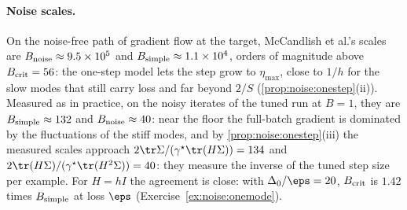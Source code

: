 \begin{refsection}
\paragraph{Noise scales.} On the noise-free path of gradient flow at the target, McCandlish et al.'s scales are $B_{\mathrm{noise}}\approx9.5\times10^5$ and $B_{\mathrm{simple}}\approx1.1\times10^4$, orders of magnitude above $B_{\mathrm{crit}}=56$: the one-step model lets the step grow to $\eta_{\max}$, close to $1/h$ for the slow modes that still carry loss and far beyond $2/S$ (\cref{prop:noise:onestep}(ii)). Measured as in practice, on the noisy iterates of the tuned run at $B=1$, they are $B_{\mathrm{simple}}\approx132$ and $B_{\mathrm{noise}}\approx40$: near the floor the full-batch gradient is dominated by the fluctuations of the stiff modes, and by \cref{prop:noise:onestep}(iii) the measured scales approach $2\tr\Sigma/(\gamma^\star\tr(H\Sigma))=134$ and $2\tr(H\Sigma)/(\gamma^\star\tr(H^2\Sigma))=40$: they measure the inverse of the tuned step size per example. For $H=hI$ the agreement is close: with $\Delta_0/\eps=20$, $B_{\mathrm{crit}}$ is $1.42$ times $B_{\mathrm{simple}}$ at loss $\eps$ (Exercise~\ref{ex:noise:onemode}).


\end{refsection}
